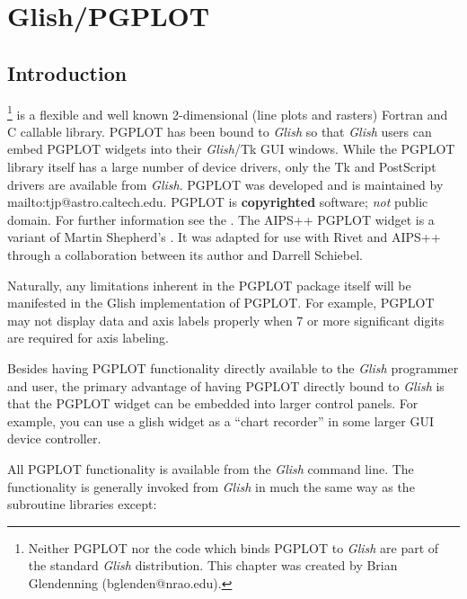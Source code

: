 
\chapter{Glish/PGPLOT}
\label{pgplot}

\section{Introduction}

\footnote{Neither PGPLOT nor the code which
binds PGPLOT to {\em Glish} are part of the standard {\em Glish}
distribution. This chapter was created by Brian Glendenning 
(bglenden@nrao.edu).} is a flexible and well known 2-dimensional 
(line plots and rasters) {\sc Fortran} and C callable
library. PGPLOT has been bound to {\em Glish} so that 
{\em Glish} users can embed PGPLOT widgets into their {\em Glish}/Tk
GUI windows.  While the PGPLOT library itself
has a large number of device drivers, only the Tk and PostScript drivers are
available from {\em Glish}. 
PGPLOT was developed and is maintained by 
 {mailto:tjp@astro.caltech.edu}.
PGPLOT is {\bf copyrighted} software; {\em not} public domain. For further information see the 
. The AIPS++ PGPLOT widget is a variant of Martin Shepherd's
.  It was adapted for use with Rivet and AIPS++
through a collaboration between its author and Darrell Schiebel.

Naturally, any limitations inherent in the PGPLOT package itself will be
manifested in the Glish implementation of PGPLOT.  For example, PGPLOT may
not display data and axis labels properly when 7 or more significant digits
are required for axis labeling.

Besides having PGPLOT functionality directly available to the {\em Glish}
programmer and user, the primary advantage of having PGPLOT directly
bound to {\em Glish} is that the PGPLOT widget can be embedded into larger
control panels.  For example, you can use a glish widget as a ``chart
recorder'' in some larger GUI device controller.

All PGPLOT functionality is available from the {\em Glish} command line.
The functionality is generally invoked from {\em Glish} in much the same way
as the subroutine libraries except:

